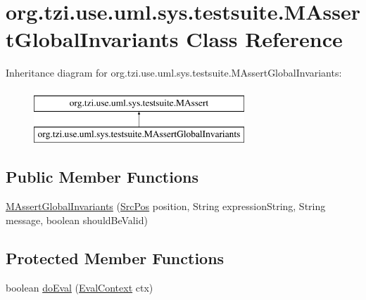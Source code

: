 \hypertarget{classorg_1_1tzi_1_1use_1_1uml_1_1sys_1_1testsuite_1_1_m_assert_global_invariants}{\section{org.\-tzi.\-use.\-uml.\-sys.\-testsuite.\-M\-Assert\-Global\-Invariants Class Reference}
\label{classorg_1_1tzi_1_1use_1_1uml_1_1sys_1_1testsuite_1_1_m_assert_global_invariants}
}
Inheritance diagram for org.\-tzi.\-use.\-uml.\-sys.\-testsuite.\-M\-Assert\-Global\-Invariants\-:\begin{figure}[H]
\begin{center}
\leavevmode
\includegraphics[height=2.000000cm]{classorg_1_1tzi_1_1use_1_1uml_1_1sys_1_1testsuite_1_1_m_assert_global_invariants}
\end{center}
\end{figure}
\subsection*{Public Member Functions}
\begin{DoxyCompactItemize}
\item 
\hyperlink{classorg_1_1tzi_1_1use_1_1uml_1_1sys_1_1testsuite_1_1_m_assert_global_invariants_a053e8fd71482210d0a19719a1a0e2700}{M\-Assert\-Global\-Invariants} (\hyperlink{classorg_1_1tzi_1_1use_1_1parser_1_1_src_pos}{Src\-Pos} position, String expression\-String, String message, boolean should\-Be\-Valid)
\end{DoxyCompactItemize}
\subsection*{Protected Member Functions}
\begin{DoxyCompactItemize}
\item 
boolean \hyperlink{classorg_1_1tzi_1_1use_1_1uml_1_1sys_1_1testsuite_1_1_m_assert_global_invariants_ad88300b5bfd2928e0bad1228ec76ca30}{do\-Eval} (\hyperlink{classorg_1_1tzi_1_1use_1_1uml_1_1ocl_1_1expr_1_1_eval_context}{Eval\-Context} ctx)
\end{DoxyCompactItemize}



